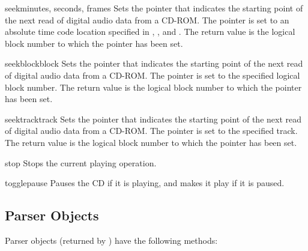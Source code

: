 \begin{methoddesc}[CD player]{seek}{minutes, seconds, frames}
Sets the pointer that indicates the starting point of the next read of
digital audio data from a CD-ROM.  The pointer is set to an absolute
time code location specified in , , and
.  The return value is the logical block number to which
the pointer has been set.
\end{methoddesc}

\begin{methoddesc}[CD player]{seekblock}{block}
Sets the pointer that indicates the starting point of the next read of
digital audio data from a CD-ROM.  The pointer is set to the specified
logical block number.  The return value is the logical block number to
which the pointer has been set.
\end{methoddesc}

\begin{methoddesc}[CD player]{seektrack}{track}
Sets the pointer that indicates the starting point of the next read of
digital audio data from a CD-ROM.  The pointer is set to the specified
track.  The return value is the logical block number to which the
pointer has been set.
\end{methoddesc}

\begin{methoddesc}[CD player]{stop}{}
Stops the current playing operation.
\end{methoddesc}

\begin{methoddesc}[CD player]{togglepause}{}
Pauses the CD if it is playing, and makes it play if it is paused.
\end{methoddesc}


\subsection{Parser Objects}
\label{cd-parser-objects}

Parser objects (returned by ) have the
following methods:

